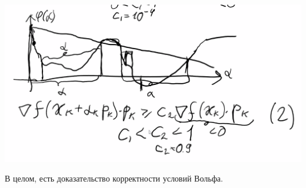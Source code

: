 \begin{center}
    \includegraphics[scale=0.333]{img/methopt_volfe_conditions_2}
\end{center}

В целом, есть доказательство корректности условий Вольфа.

